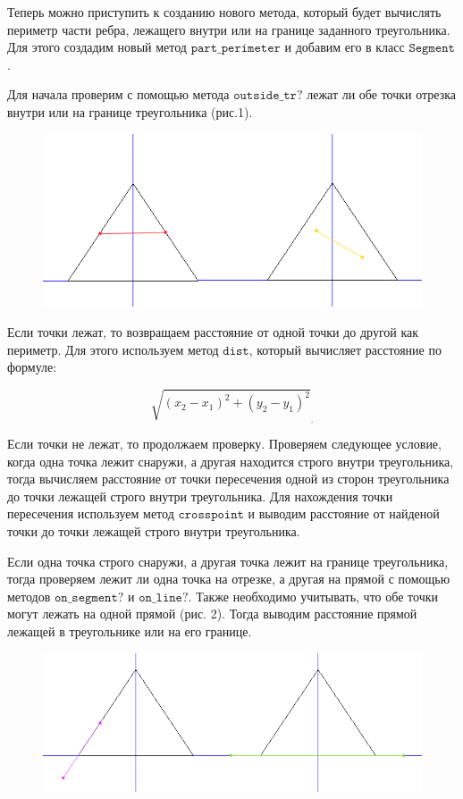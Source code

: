Теперь можно приступить к созданию нового метода, который будет вычислять периметр части ребра, лежащего 
внутри или на границе заданного треугольника. Для этого создадим новый метод $\texttt{part\_perimeter}$ 
и добавим его в класс $\texttt{Segment}$.

Для начала проверим с помощью метода $\texttt{outside\_tr?}$ лежат ли обе точки отрезка внутри или на границе треугольника (рис.1). 
\newpage\begin{figure}[ht!]
\begin{center}
\includegraphics[width=0.8\hsize]{images/1}
\end{center}
\caption{}\label{fig:convex}
\end{figure}


Если точки лежат, то возвращаем расстояние от одной точки до другой как периметр. Для этого используем метод $\texttt{dist}$, который вычисляет расстояние по формуле:

$$\sqrt{(x_2-x_1)^2+(y_2-y_1)^2}_.$$

Если точки не лежат, то продолжаем проверку. Проверяем следующее условие, когда одна точка лежит снаружи, а другая находится строго внутри треугольника, 
тогда вычисляем расстояние от точки пересечения одной из сторон треугольника до точки лежащей строго внутри треугольника. Для нахождения точки пересечения используем метод  
$\texttt{crosspoint}$ и выводим расстояние от найденой точки до точки лежащей строго внутри треугольника. 

Если одна точка строго снаружи, а другая точка лежит на границе треугольника, тогда проверяем лежит ли 
одна точка на отрезке, а другая на прямой с помощью методов $\texttt{on\_segment? и on\_line?}$. Также необходимо учитывать,
что обе точки могут лежать на одной прямой (рис. 2). Тогда выводим расстояние прямой лежащей в треугольнике или на его границе.
\begin{figure}[ht!]
\begin{center}
\includegraphics[width=0.8\hsize]{images/2}
\end{center}
\caption{}\label{fig:convex}
\end{figure}

